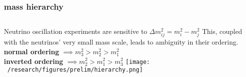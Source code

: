 \documentclass{beamer}
\begin{document}
	\begin{frame}
		\frametitle{mass hierarchy}
		\begin{columns}[c] %
			
			Neutrino oscillation experiments are sensitive to $\Delta m_{ij}^2 = m_i^2 - m_j^2$ 
			This, coupled with the neutrinos' very small mass scale, leads to ambiguity in their ordering.
			\textbf{normal ordering} $\implies m_3^2 > m_2^2 > m_1^2$ \\
			\textbf{inverted ordering} $\implies m_2^2 > m_1^2 > m_3^2$
			\texttt{[image: ~/research/figures/prelim/hierarchy.png]}

			
		\end{columns}
	\end{frame}
	
	
		
	
%			
%			
	
\end{document}
